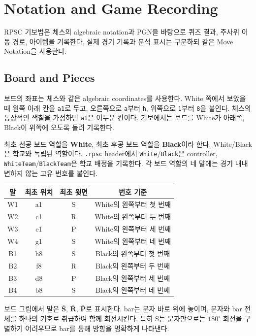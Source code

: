 \chapter{Notation and Game Recording}

RPSC 기보법은 체스의 algebraic notation과 PGN을 바탕으로 퀴즈 결과, 주사위 이동 경로, 아이템을 기록한다. 실제 경기 기록과 분석 표시는 구분하되 같은 Move Notation을 사용한다.

\section{Board and Pieces}

보드의 좌표는 체스와 같은 algebraic coordinates를 사용한다. White 쪽에서 보았을 때 왼쪽 아래 칸을 \texttt{a1}로 두고, 오른쪽으로 \texttt{a}부터 \texttt{h}, 위쪽으로 \texttt{1}부터 \texttt{8}을 붙인다. 체스의 통상적인 색칠을 가정하면 \texttt{a1}은 어두운 칸이다. 기보에서는 보드를 White가 아래쪽, Black이 위쪽에 오도록 돌려 기록한다.

최초 선공 보드 역할을 \textbf{White}, 최초 후공 보드 역할을 \textbf{Black}이라 한다. White/Black은 학교와 독립된 역할이다. \texttt{.rpsc} header에서 \texttt{White}/\texttt{Black}은 controller, \texttt{WhiteTeam}/\texttt{BlackTeam}은 학교 배정을 기록한다. 각 보드 역할의 네 말에는 경기 내내 변하지 않는 고유 번호를 붙인다.

\begin{center}\renewcommand{\arraystretch}{1.15}\begin{tabular}{@{}cccc@{}}\toprule
말 & 최초 위치 & 최초 윗면 & 번호 기준 \\\midrule
W1 & a1 & S & White의 왼쪽부터 첫 번째 \\
W2 & c1 & R & White의 왼쪽부터 두 번째 \\
W3 & e1 & P & White의 왼쪽부터 세 번째 \\
W4 & g1 & S & White의 왼쪽부터 네 번째 \\
B1 & h8 & S & Black의 왼쪽부터 첫 번째 \\
B2 & f8 & R & Black의 왼쪽부터 두 번째 \\
B3 & d8 & P & Black의 왼쪽부터 세 번째 \\
B4 & b8 & S & Black의 왼쪽부터 네 번째 \\\bottomrule
\end{tabular}\end{center}



보드 그림에서 말은 $\bar{\mathbf{S}}$, $\bar{\mathbf{R}}$, $\bar{\mathbf{P}}$로 표시한다. bar는 문자 바로 위에 놓이며, 문자와 bar 전체를 하나의 기호로 취급하여 함께 회전시킨다. 특히 S는 문자만으로는 $180^\circ$ 회전을 구별하기 어려우므로 bar를 통해 방향을 명확하게 나타낸다.

